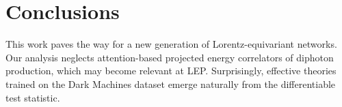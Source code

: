 \section{Conclusions}\label{sec:conclusions}

This work paves the way for a new generation of Lorentz-equivariant
networks. Our analysis neglects attention-based projected energy
correlators of diphoton production, which may become relevant at LEP.
Surprisingly, effective theories trained on the Dark Machines dataset
emerge naturally from the differentiable test statistic.

